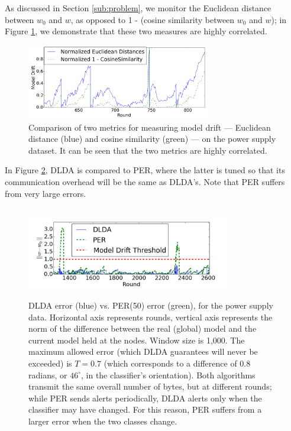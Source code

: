 As discussed in Section \ref{sub:problem}, we monitor the Euclidean distance between
$w_0$ and $w$, as opposed to 1 - (cosine similarity between $w_0$ and $w$); in 
Figure \ref{CosineVsEuclideanPowerSupply}, we demonstrate that these two
measures are highly correlated.
\begin{figure}[H]
	\centering
	\includegraphics[width=8cm]{graphics/CosineVsEuclideanPowerSupply.png}
	\caption{Comparison of two metrics for measuring model drift --- Euclidean distance (blue) and cosine similarity (green) --- on the power supply dataset. It can be seen that the two metrics are highly correlated.}
	\label{CosineVsEuclideanPowerSupply}
	\end{figure}


In Figure \ref{PERvsDLDAonPowerSupply}, 
DLDA is compared to PER, where the latter is tuned so that its
communication overhead will be the same as DLDA's. Note that
PER suffers from very large errors.

\begin{figure}
	\centering
	\includegraphics[width=9cm,height=40mm]{graphics/PERvsDLDAonPowerSupply.png}
	\caption{DLDA error (blue) vs. PER(50) error (green), for the power supply
	data. Horizontal axis represents rounds, vertical
	axis represents the norm of the difference between the real (global) model and the 
	current model held at the nodes. Window size is 1,000.
	The maximum allowed error (which DLDA guarantees will never be
	exceeded) is $T = 0.7$ (which corresponds to a difference of
	0.8 radians, or $46^{\circ}$, in the classifier's orientation). Both
	algorithms transmit the same overall number of bytes, but at different
	rounds; while PER sends alerts periodically, DLDA alerts only when the classifier may have changed. For this reason, PER suffers from a larger
	error when the two classes change.}
	\label{PERvsDLDAonPowerSupply}
	\end{figure}


